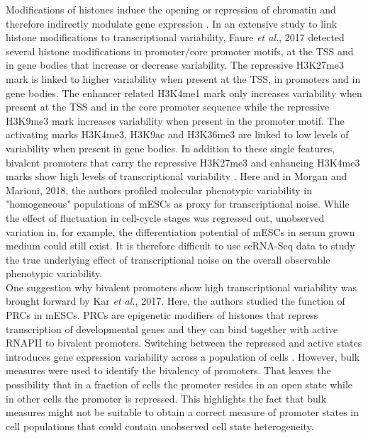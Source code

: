 Modifications of histones induce the opening or repression of chromatin and  therefore indirectly modulate gene expression \citep{Suganuma2011}. 
In an extensive study to link histone modifications to transcriptional variability, Faure \textit{et al.}, 2017 detected several histone modifications in promoter/core promoter motifs, at the TSS and in gene bodies that increase or decrease variability. 
The repressive \gls{H3K27me3} mark is linked to higher variability when present at the TSS, in promoters and in gene bodies. 
The enhancer related \gls{H3K4me1} mark only increases variability when present at the TSS and in the core promoter sequence while the repressive \gls{H3K9me3} mark increases variability when present in the promoter motif. 
The activating marks \gls{H3K4me3}, \gls{H3K9ac} and \gls{H3K36me3} are linked to low levels of variability when present in gene bodies. 
In addition to these single features, bivalent promoters that carry the repressive \gls{H3K27me3} and enhancing \gls{H3K4me3} marks show high levels of transcriptional variability \citep{Faure2017}.
Here and in Morgan and Marioni, 2018, the authors profiled molecular phenotypic variability in "homogeneous" populations of \glspl{mESC} as proxy for transcriptional noise.
While the effect of fluctuation in cell-cycle stages was regressed out, unobserved variation in, for example, the differentiation potential of mESCs in serum grown medium \cite{Kolodziejczyk2015cell} could still exist.
It is therefore difficult to use scRNA-Seq data to study the true underlying effect of transcriptional noise on the overall observable phenotypic variability.\\ 

One suggestion why bivalent promoters show high transcriptional variability was brought forward by Kar \emph{et al.}, 2017.
Here, the authors studied the function of \glspl{PRC} in mESCs.
PRCs are epigenetic modifiers of histones that repress transcription of developmental genes \citep{Chittock2017} and they can bind together with active \gls{RNAPII} to bivalent promoters. 
Switching between the repressed and active states introduces gene expression variability across a population of cells \cite{Kar2017}.
However, bulk measures were used to identify the bivalency of promoters.
That leaves the possibility that in a fraction of cells the promoter resides in an open state while in other cells the promoter is repressed. 
This highlights the fact that bulk measures might not be suitable to obtain a correct measure of promoter states in cell populations that could contain unobserved cell state heterogeneity. \\

